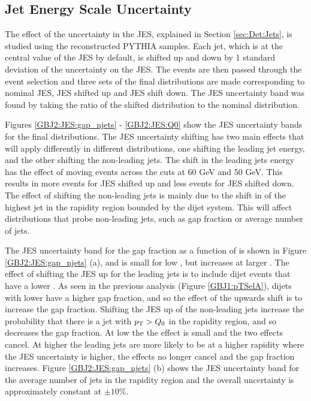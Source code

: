 \subsection{Jet Energy Scale Uncertainty}

The effect of the uncertainty in the JES, explained in Section \ref{sec:Det:Jets}, is studied using the reconstructed PYTHIA samples.
Each jet, which is at the central value of the JES by default, is shifted up and down by 1 standard deviation of the uncertainty on the JES.
The events are then passed through the event selection and three sets of the final distributions are made corresponding to nominal JES,  JES shifted up and JES shift down.
The JES uncertainty band was found by taking the ratio of the shifted distribution to the nominal distribution.


Figures \ref{GBJ2:JES:gap_njets} - \ref{GBJ2:JES:Q0} show the JES uncertainty bands for the final distributions.
The JES uncertainty shifting has two main effects that will apply differently in different distributions, one shifting the leading jet energy, and the other shifting the non-leading jets.
The shift in the leading jets energy has the effect of moving events across the \pt{} cuts at 60 GeV and 50 GeV.
This results in more events for JES shifted up and less events for JES shifted down. 
The effect of shifting the non-leading jets is mainly due to the shift in \pt{} of the highest \pt{} jet in the rapidity region bounded by the dijet system. 
This will affect distributions that probe non-leading jets, such as gap fraction or average number of jets. 

The JES uncertainty band for the gap fraction as a function of \dy{} is shown in Figure \ref{GBJ2:JES:gap_njets} (a), and is small for low \dy{}, but increases at larger \dy{}.
The effect of shifting the JES up for the leading jets is to include dijet events that have a lower \ptb{}. 
As seen in the previous analysis (Figure \ref{GBJ1:pTSelA}), dijets with lower \ptb{} have a higher gap fraction, and so the effect of the upwards shift is to increase the gap fraction.
Shifting the JES up of the non-leading jets increase the probability that there is a jet with $\mbox{$p_{\rm T}$}{}>Q_0$ in the rapidity region, and so decreases the gap fraction. 
At low \dy{} the the effect is small and the two effects cancel.
At higher \dy{} the leading jets are more likely to be at a higher rapidity where the JES uncertainty is higher, the effects no longer cancel and the gap fraction increases.
Figure \ref{GBJ2:JES:gap_njets} (b) shows the JES uncertainty band for the average number of jets in the rapidity region and the overall uncertainty is approximately constant at $\pm 10 \%$.


